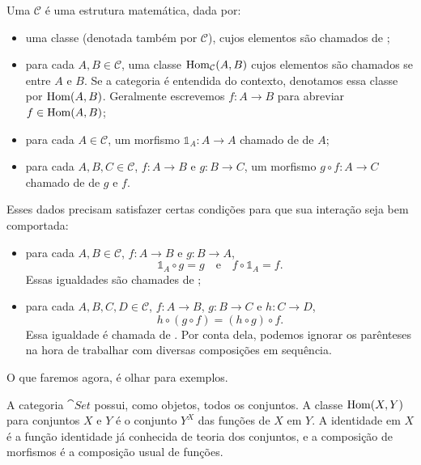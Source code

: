 \begin{definicao}
    Uma  $\mathcal{C}$ é uma estrutura matemática, dada por: \begin{itemize}
        \item uma classe (denotada também por $\mathcal{C}$), cujos elementos são chamados de ;
        \item para cada $A, B \in \mathcal{C}$, uma classe $\operatorname{Hom}_{\mathcal{C}}(A,B)$ cujos elementos são chamados se  entre $A$ e $B$. Se a categoria é entendida do contexto, denotamos essa classe por $\operatorname{Hom}(A,B)$. Geralmente escrevemos $f \colon A \to B$ para abreviar $f \in \operatorname{Hom}(A,B)$;
        \item para cada $A \in \mathcal{C}$, um morfismo $\mathbb{1}_A \colon A \to A$ chamado de  de $A$;
        \item para cada $A, B, C \in \mathcal{C}$, $f \colon A \to B$ e $g \colon B \to C$, um morfismo $g \circ f \colon A \to C$ chamado de  de $g$ e $f$.
    \end{itemize} Esses dados precisam satisfazer certas condições para que sua interação seja bem comportada: \begin{itemize}
        \item para cada $A, B \in \mathcal{C}$, $f \colon A \to B$ e $g \colon B \to A$, \begin{equation}
            \mathbb{1}_A \circ g = g \quad \text{e} \quad f \circ \mathbb{1}_A = f.
        \end{equation} Essas igualdades são chamades de ;
        \item para cada $A, B, C, D \in \mathcal{C}$, $f \colon A \to B$, $g \colon B \to C$ e $h \colon C \to D$, \begin{equation}
            h \circ (g \circ f) = (h \circ g) \circ f.
        \end{equation} Essa igualdade é chamada de . Por conta dela, podemos ignorar os parênteses na hora de trabalhar com diversas composições em sequência.
    \end{itemize}
\end{definicao}

O que faremos agora, é olhar para exemplos.

\begin{exemplo}
    A categoria $\cat{Set}$ possui, como objetos, todos os conjuntos. A classe $\operatorname{Hom}(X, Y)$ para conjuntos $X$ e $Y$ é o conjunto $Y^X$ das funções de $X$ em $Y$. A identidade em $X$ é a função identidade já conhecida de teoria dos conjuntos, e a composição de morfismos é a composição usual de funções.
\end{exemplo}

